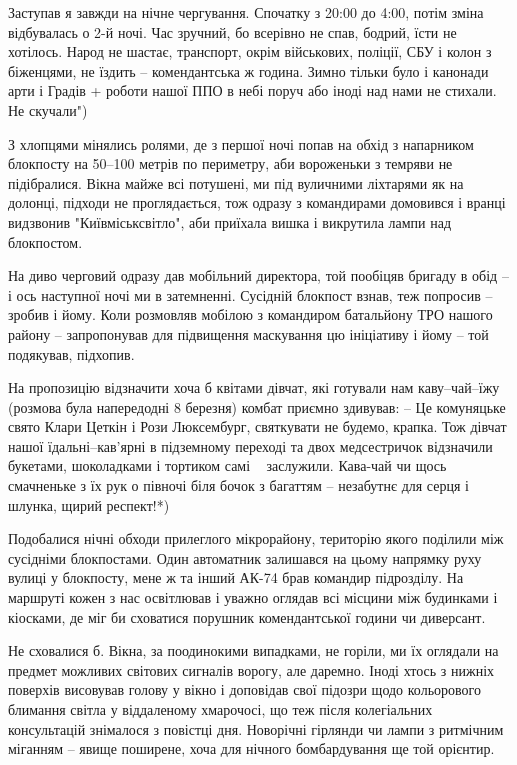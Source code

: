 Заступав я завжди на нічне чергування. Спочатку з 20:00 до 4:00, потім зміна
відбувалась о 2-й ночі. Час зручний, бо всерівно не спав, бодрий, їсти не
хотілось. Народ не шастає, транспорт, окрім військових, поліції, СБУ і колон з
біженцями, не їздить – комендантська ж година. Зимно тільки було і канонади
арти і Градів + роботи нашої ППО в небі поруч або іноді над нами не стихали. Не
скучали")

З хлопцями мінялись ролями, де з першої ночі попав на обхід з напарником
блокпосту на 50–100 метрів по периметру, аби вороженьки з темряви не
підібралися. Вікна майже всі потушені, ми під вуличними ліхтарями як на
долонці, підходи не проглядається, тож одразу з командирами домовився і вранці
видзвонив "Київміськсвітло", аби приїхала вишка і викрутила лампи над
блокпостом. 

На диво черговий одразу дав мобільний директора, той пообіцяв бригаду в обід –
і ось наступної ночі ми в затемненні. Сусідній блокпост взнав, теж попросив –
зробив і йому. Коли розмовляв мобілою з командиром батальйону ТРО нашого району
– запропонував для підвищення маскування цю ініціативу і йому – той подякував,
підхопив. 

На пропозицію відзначити хоча б квітами дівчат, які готували нам каву–чай–їжу
(розмова була напередодні 8 березня) комбат приємно здивував: – Це комуняцьке
свято Клари Цеткін і Рози Люксембург, святкувати не будемо, крапка. Тож дівчат
нашої їдальні–кав'ярні в підземному переході та двох медсестричок відзначили
букетами, шоколадками і тортиком самі ~ заслужили. Кава-чай чи щось смачненьке
з їх рук о півночі біля бочок з багаттям – незабутнє для серця і шлунка, щирий
респект!*)

Подобалися нічні обходи прилеглого мікрорайону, територію якого поділили між
сусідніми блокпостами. Один автоматник залишався на цьому напрямку руху вулиці
у блокпосту, мене ж та інший АК-74 брав командир підрозділу. На маршруті кожен
з нас освітлював і уважно оглядав всі місцини між будинками і кіосками, де міг
би сховатися порушник комендантської години чи диверсант. 

Не сховалися б. Вікна, за поодинокими випадками, не горіли, ми їх оглядали на
предмет можливих світових сигналів ворогу, але даремно. Іноді хтось з нижніх
поверхів висовував голову у вікно і доповідав свої підозри щодо кольорового
блимання світла у віддаленому хмарочосі, що теж після колегіальних консультацій
знімалося з повістці дня. Новорічні гірлянди чи лампи з ритмічним міганням –
явище поширене, хоча для нічного бомбардування ще той орієнтир.

